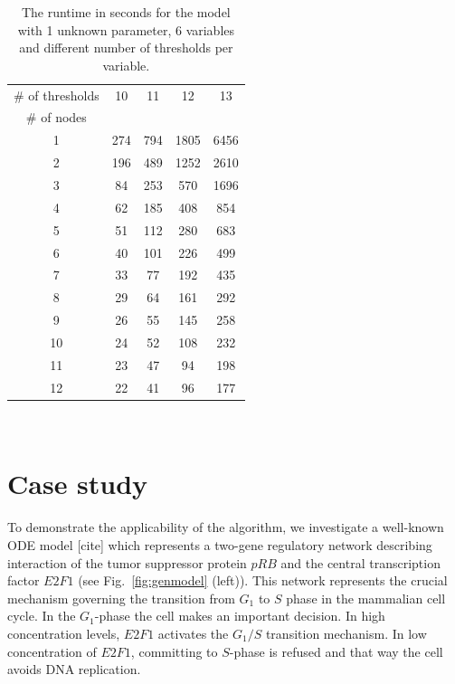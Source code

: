 \documentclass[12pt,oneside,draft]{fithesis2}
\begin{document}
			\begin{table}
				\centering
				\setlength{\tabcolsep}{6pt}
				\begin{tabular}{|*{5}{c|}}
					\hline
						\# of thresholds & 10 & 11 & 12 & 13 \\
						\cline{1-1}
						\# of nodes & & & & \\
					\hline
						1 &	274 &	794 &	1805 &	6456 \\
						2 &	196 &	489 &	1252 &	2610 \\
						3 &	84 &	253 &	570 &	1696 \\
						4 &	62 &	185 &	408 &	 854 \\
						5 &	51 &	112 &	280 & 683 \\
						6 &	40 &	101 &	226 &	499 \\
						7 &	33 &	77 &	192 &	435 \\
						8 &	29 &	64 &	161 &	292 \\
						9 &	26 &	55 &	145 &	258 \\
						10 &	24 &	52 &	108 &	232 \\
						11 &	23 &	47 &	94 &	198 \\
						12 & 22	 & 41	 & 96	&	177 \\
					\hline
				\end{tabular}\\[1em]
				\caption{The runtime in seconds for the model with 1 unknown parameter, 6 variables and different number of thresholds per variable.}
			\end{table}

			\newpage
						\newpage
									\newpage			\newpage
			\section{Case study}
			
				To demonstrate the applicability of the algorithm, we investigate a well-known ODE model [cite] which represents a two-gene regulatory network describing interaction of the tumor suppressor protein $pRB$ and the central transcription factor $E2F1$ (see Fig.~\ref{fig:genmodel} (left)). This network represents the crucial mechanism governing the transition from $G_1$ to $S$ phase in the mammalian cell cycle. In the $G_1$-phase the cell makes an important decision. In high concentration levels, $E2F1$ activates the $G_1/S$ transition mechanism. In low concentration of $E2F1$, committing to $S$-phase is refused and that way the cell avoids DNA replication.
				
\end{document}
